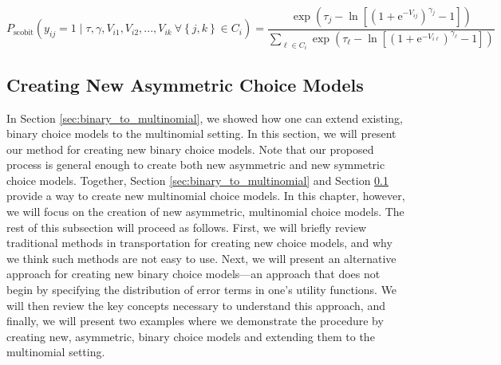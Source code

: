 \begin{equation*}
P_{\textrm{scobit}} \left( y_{ij} = 1 \mid \tau, \gamma, V_{i1}, V_{i2}, ..., V_{ik} \ \forall \left\lbrace j, k \right\rbrace \in C_i \right) = \frac{\exp \left( \tau _j - \ln \left[ \left( 1 + \mathrm{e}^{- V_{ij}} \right)^ {\gamma _j} - 1 \right] \right)}{ \sum _{\ell \in C_i} \exp \left( \tau _{\ell} - \ln \left[ \left( 1 + \mathrm{e}^{- V_{i \ell}} \right)^ {\gamma _{\ell}} - 1 \right] \right)}
\end{equation*}

\subsection{Creating New Asymmetric Choice Models}
\label{sec:deriving_binary_asym_models}
In Section \ref{sec:binary_to_multinomial}, we showed how one can extend existing, binary choice models to the multinomial setting. In this section, we will present our method for creating new binary choice models. Note that our proposed process is general enough to create both new asymmetric and new symmetric choice models. Together, Section \ref{sec:binary_to_multinomial} and Section \ref{sec:deriving_binary_asym_models} provide a way to create new multinomial choice models. In this chapter, however, we will focus on the creation of new asymmetric, multinomial choice models. The rest of this subsection will proceed as follows. First, we will briefly review traditional methods in transportation for creating new choice models, and why we think such methods are not easy to use. Next, we will present an alternative approach for creating new binary choice models---an approach that does not begin by specifying the distribution of error terms in one's utility functions. We will then review the key concepts necessary to understand this approach, and finally, we will present two examples where we demonstrate the procedure by creating new, asymmetric, binary choice models and extending them to the multinomial setting.

